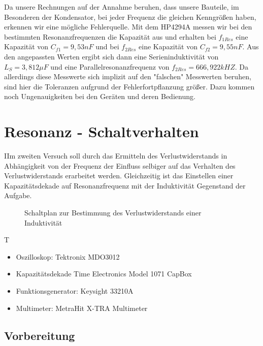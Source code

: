 \documentclass{article}
\begin{document}
Da unsere Rechnungen auf der Annahme beruhen, dass unsere Bauteile, im Besonderen der Kondensator, bei jeder Frequenz die gleichen Kenngrößen haben,
erkennen wir eine mögliche Fehlerquelle. Mit dem HP4294A messen wir bei den bestimmten Resonanzfrequenzen die Kapazität aus und erhalten bei $f_{1Res}$ eine Kapazität
von $C_{f1}=9,53nF$ und bei $f_{2Res}$ eine Kapazität von $C_{f2} = 9,55nF$. Aus den angepassten Werten ergibt sich dann eine Serieninduktivität von $L_S = 3,812\mu F$
und eine Parallelresonanzfrequenz von $f_{2Res} = 666,922kHZ$. Da allerdings diese Messwerte sich implizit auf den "falschen" Messwerten beruhen, sind hier die Toleranzen aufgrund der
Fehlerfortpflanzung größer. Dazu kommen noch Ungenauigkeiten bei den Geräten und deren Bedienung.


\newpage
\section{Resonanz - Schaltverhalten}
\begin{task}
  IIm zweiten Versuch soll durch das Ermitteln des Verlustwiderstands in Abhängigkeit von der Frequenz der Einfluss selbiger auf das Verhalten des Verlustwiderstands erarbeitet werden.
  Gleichzeitig ist das Einstellen einer Kapazitätsdekade auf Resonanzfrequenz mit der Induktivität Gegenstand der Aufgabe.
\end{task}
\begin{figure}[h]
  \begin{center}

    \caption{Schaltplan zur Bestimmung des Verlustwiderstands einer Induktivität}
  \end{center}
\end{figure}
\begin{devlist}
  T
  \begin{itemize}
    \item Oszilloskop: Tektronix MDO3012
    \item Kapazitätsdekade Time Electronics Model 1071 CapBox
    \item Funktionsgenerator: Keysight 33210A
    \item Multimeter: MetraHit X-TRA Multimeter
  \end{itemize}
\end{devlist}
\subsection{Vorbereitung}
\end{document}
